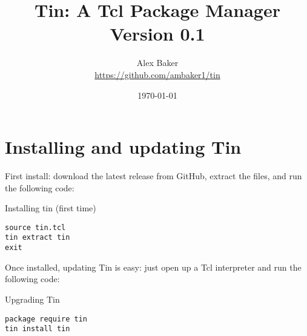 \documentclass{article}
\title{\Huge Tin: A Tcl Package Manager\\\small Version 0.1}
\author{Alex Baker\\\small\hyperlink{https://github.com/ambaker1/tin}{https://github.com/ambaker1/tin}}
\date{\small\today}
\renewcommand{\^}[1]{\textsuperscript{#1}}
\renewcommand{\_}[1]{\textsubscript{#1}}
\begin{document}
\maketitle
\clearpage
\section{Installing and updating Tin}
First install: download the latest release from GitHub, extract the files, and run the following code:
\begin{example}{Installing tin (first time)}
\begin{lstlisting}
source tin.tcl
tin extract tin
exit
\end{lstlisting}
\end{example}
Once installed, updating Tin is easy: just open up a Tcl interpreter and run the following code:
\begin{example}{Upgrading Tin}
\begin{lstlisting}
package require tin
tin install tin
\end{lstlisting}
\end{example}
\clearpage
\end{document}

